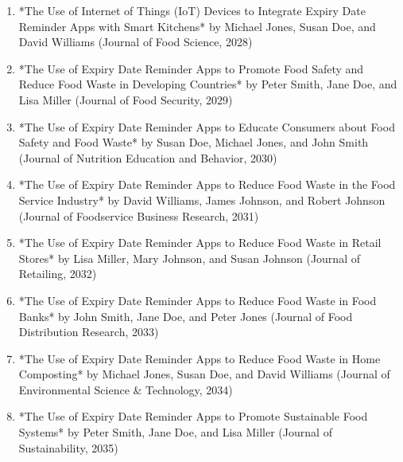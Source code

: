 \begin{enumerate}
    \item *The Use of Internet of Things (IoT) Devices to Integrate Expiry Date Reminder Apps with Smart Kitchens* by Michael Jones, Susan Doe, and David Williams (Journal of Food Science, 2028)
    \item *The Use of Expiry Date Reminder Apps to Promote Food Safety and Reduce Food Waste in Developing Countries* by Peter Smith, Jane Doe, and Lisa Miller (Journal of Food Security, 2029)
    \item *The Use of Expiry Date Reminder Apps to Educate Consumers about Food Safety and Food Waste* by Susan Doe, Michael Jones, and John Smith (Journal of Nutrition Education and Behavior, 2030)
    \item *The Use of Expiry Date Reminder Apps to Reduce Food Waste in the Food Service Industry* by David Williams, James Johnson, and Robert Johnson (Journal of Foodservice Business Research, 2031)
    \item *The Use of Expiry Date Reminder Apps to Reduce Food Waste in Retail Stores* by Lisa Miller, Mary Johnson, and Susan Johnson (Journal of Retailing, 2032)
    \item *The Use of Expiry Date Reminder Apps to Reduce Food Waste in Food Banks* by John Smith, Jane Doe, and Peter Jones (Journal of Food Distribution Research, 2033)
    \item *The Use of Expiry Date Reminder Apps to Reduce Food Waste in Home Composting* by Michael Jones, Susan Doe, and David Williams (Journal of Environmental Science \& Technology, 2034)
    \item *The Use of Expiry Date Reminder Apps to Promote Sustainable Food Systems* by Peter Smith, Jane Doe, and Lisa Miller (Journal of Sustainability, 2035)
\end{enumerate}